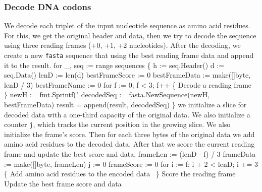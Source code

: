 \subsubsection{Decode DNA codons}
We decode each triplet of the input nucleotide sequence as amino acid
residues. For this, we get the original header and data, then we try
to decode the sequence using three reading frames (+0, +1, +2
nucleotides). After the decoding, we create a new \texttt{fasta}
sequence that using the best reading frame data and append it to the
result.
\nwenddocs{}\endmoddef\nwstartdeflinemarkup{}\nwenddeflinemarkup
for _, seq := range sequences \{
          h := seq.Header()
          d := seq.Data()
          lenD := len(d)
          bestFrameScore := 0
          bestFrameData := make([]byte, lenD / 3)
          bestFrameName := 0
          for f := 0; f < 3; f++ \{
                  \LA{}Decode a reading frame~{\nwtagstyle{}}\RA{}
          \}
          newH := fmt.Sprintf("%
          decodedSeq := fasta.NewSequence(newH, bestFrameData)
          result = append(result, decodedSeq)
\}
\nwendcode{}\nwdocspar
we initialize a slice for decoded data with a one-third capacity of
the original data. We also initialize a counter \texttt{j}, which
tracks the current position in the growing slice. We also initialize
the frame's score. Then for each three bytes of the original data we
add amino acid residues to the decoded data. After that we score the
current reading frame and update the best score and data.
\nwenddocs{}\endmoddef\nwstartdeflinemarkup{}\nwenddeflinemarkup
frameLen := (lenD - f) / 3
frameData := make([]byte, frameLen)
j := 0
frameScore := 0
for i := f; i + 2 < lenD; i += 3 \{
          \LA{}Add amino acid residues to the encoded data~{\nwtagstyle{}}\RA{}
\}
\LA{}Score the reading frame~{\nwtagstyle{}}\RA{}
\LA{}Update the best frame score and data~{\nwtagstyle{}}\RA{}
\nwendcode{}\nwdocspar
